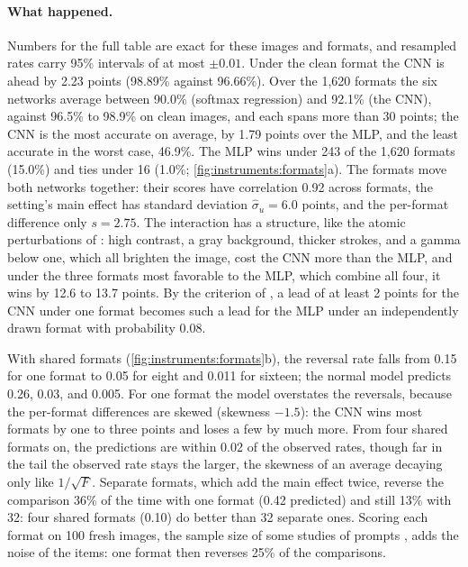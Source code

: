 \begin{refsection}
\paragraph{What happened.} Numbers for the full table are exact for these images and formats, and resampled rates carry 95\% intervals of at most $\pm0.01$. Under the clean format the CNN is ahead by 2.23 points (98.89\% against 96.66\%). Over the 1,620 formats the six networks average between 90.0\% (softmax regression) and 92.1\% (the CNN), against 96.5\% to 98.9\% on clean images, and each spans more than 30 points; the CNN is the most accurate on average, by 1.79 points over the MLP, and the least accurate in the worst case, 46.9\%. The MLP wins under 243 of the 1,620 formats (15.0\%) and ties under 16 (1.0\%; \cref{fig:instruments:formats}a). The formats move both networks together: their scores have correlation 0.92 across formats, the setting's main effect has standard deviation $\hat\sigma_u=6.0$ points, and the per-format difference only $s=2.75$. The interaction has a structure, like the atomic perturbations of \textcite{SclarEtAl2024}: high contrast, a gray background, thicker strokes, and a gamma below one, which all brighten the image, cost the CNN more than the MLP, and under the three formats most favorable to the MLP, which combine all four, it wins by 12.6 to 13.7 points. By the criterion of \textcite{SclarEtAl2024}, a lead of at least 2 points for the CNN under one format becomes such a lead for the MLP under an independently drawn format with probability 0.08.

With shared formats (\cref{fig:instruments:formats}b), the reversal rate falls from 0.15 for one format to 0.05 for eight and 0.011 for sixteen; the normal model predicts 0.26, 0.03, and 0.005. For one format the model overstates the reversals, because the per-format differences are skewed (skewness $-1.5$): the CNN wins most formats by one to three points and loses a few by much more. From four shared formats on, the predictions are within 0.02 of the observed rates, though far in the tail the observed rate stays the larger, the skewness of an average decaying only like $1/\sqrt F$. Separate formats, which add the main effect twice, reverse the comparison 36\% of the time with one format (0.42 predicted) and still 13\% with 32: four shared formats (0.10) do better than 32 separate ones. Scoring each format on 100 fresh images, the sample size of some studies of prompts \parencite{WeiEtAl2023larger,MizrahiEtAl2024}, adds the noise of the items: one format then reverses 25\% of the comparisons.


\end{refsection}
